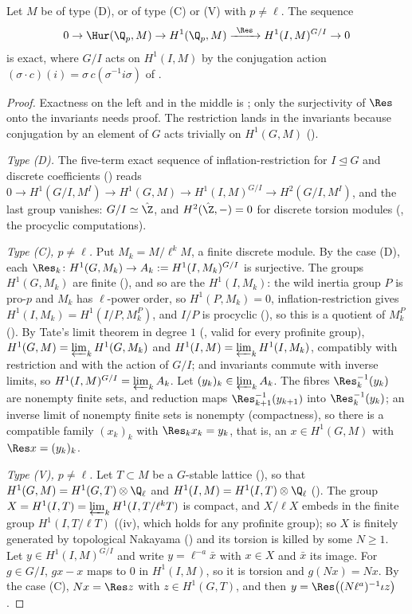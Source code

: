 \begin{proposition}\label{prop:galcoh:ur-sequence}
Let $M$ be of type (D), or of type (C) or (V) with $p\ne\ell$. The sequence
\[
0\to\Hur(\Q_p,M)\to H^1(\Q_p,M)\xrightarrow{\ \Res\ }H^1(I,M)^{G/I}\to0
\]
is exact, where $G/I$ acts on $H^1(I,M)$ by the conjugation action $(\sigma\cdot c)(i)=\sigma\,c(\sigma^{-1}i\sigma)$ of .
\end{proposition}

\begin{proof}
Exactness on the left and in the middle is ; only the surjectivity of $\Res$ onto the invariants needs proof. The restriction lands in the
invariants because conjugation by an element of $G$ acts trivially on $H^1(G,M)$ ().

\emph{Type (D).} The five-term exact sequence of inflation-restriction for $I\trianglelefteq G$ and discrete coefficients () reads
$0\to H^1(G/I,M^I)\to H^1(G,M)\to H^1(I,M)^{G/I}\to H^2(G/I,M^I)$, and the last group vanishes: $G/I\simeq\hat\Z$, and $H^2(\hat\Z,-)=0$ for discrete torsion modules
(, the procyclic computations).

\emph{Type (C), $p\ne\ell$.} Put $M_k=M/\ell^kM$, a finite discrete module. By the case (D), each
$\Res_k\colon H^1(G,M_k)\to A_k:=H^1(I,M_k)^{G/I}$ is surjective. The groups $H^1(G,M_k)$ are finite (), and so are the $H^1(I,M_k)$: the
wild inertia group $P$ is pro-$p$ and $M_k$ has $\ell$-power order, so $H^1(P,M_k)=0$, inflation-restriction gives $H^1(I,M_k)=H^1(I/P,M_k^P)$, and $I/P$ is procyclic
(), so this is a quotient of $M_k^P$ (). By Tate's limit theorem in degree $1$ (, valid for every profinite group),
$H^1(G,M)=\varprojlim_kH^1(G,M_k)$ and $H^1(I,M)=\varprojlim_kH^1(I,M_k)$, compatibly with restriction and with the action of $G/I$; and invariants commute with inverse
limits, so $H^1(I,M)^{G/I}=\varprojlim_kA_k$. Let $(y_k)_k\in\varprojlim_kA_k$. The fibres $\Res_k^{-1}(y_k)$ are nonempty finite sets, and reduction maps
$\Res_{k+1}^{-1}(y_{k+1})$ into $\Res_k^{-1}(y_k)$; an inverse limit of nonempty finite sets is nonempty (compactness), so there is a compatible family $(x_k)_k$ with
$\Res_kx_k=y_k$, that is, an $x\in H^1(G,M)$ with $\Res x=(y_k)_k$.

\emph{Type (V), $p\ne\ell$.} Let $T\subset M$ be a $G$-stable lattice (), so that $H^1(G,M)=H^1(G,T)\otimes\Q_\ell$ and $H^1(I,M)=H^1(I,T)\otimes\Q_\ell$
(). The group $X=H^1(I,T)=\varprojlim_kH^1(I,T/\ell^kT)$ is compact, and $X/\ell X$ embeds in the finite group $H^1(I,T/\ell T)$ ((iv),
which holds for any profinite group); so $X$ is finitely generated by topological Nakayama () and its torsion is killed by some $N\ge1$. Let
$y\in H^1(I,M)^{G/I}$ and write $y=\ell^{-a}\bar x$ with $x\in X$ and $\bar x$ its image. For $g\in G/I$, $gx-x$ maps to $0$ in $H^1(I,M)$, so it is torsion and
$g(Nx)=Nx$. By the case (C), $Nx=\Res z$ with $z\in H^1(G,T)$, and then $y=\Res\bigl((N\ell^a)^{-1}\iota z\bigr)$.
\end{proof}

